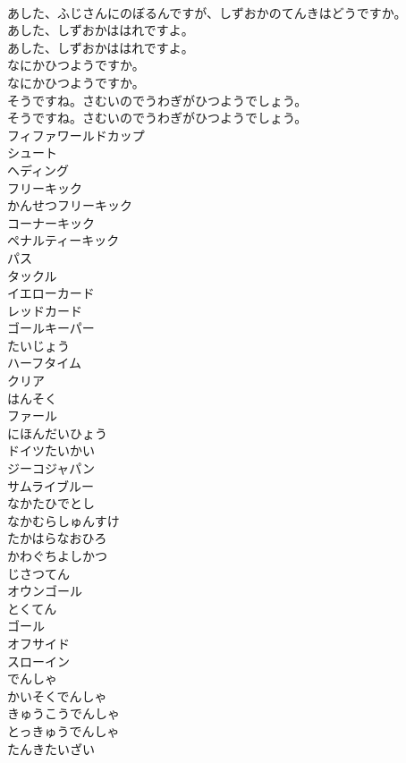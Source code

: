 \documentclass[8pt]{extreport}
\begin{document}
\begin{CJK}{UTF8}{min}
\\	あした、ふじさんにのぼるんですが、しずおかのてんきはどうですか。 
\\	あした、しずおかははれですよ。	
\\	あした、しずおかははれですよ。 
\\	なにかひつようですか。	
\\	なにかひつようですか。 
\\	そうですね。さむいのでうわぎがひつようでしょう。	
\\	そうですね。さむいのでうわぎがひつようでしょう。 
\\	フィファワールドカップ
\\	シュート
\\	ヘディング
\\	フリーキック
\\	かんせつフリーキック
\\	コーナーキック
\\	ペナルティーキック
\\	パス
\\	タックル
\\	イエローカード
\\	レッドカード
\\	ゴールキーパー
\\	たいじょう
\\	ハーフタイム
\\	クリア
\\	はんそく
\\	ファール
\\	にほんだいひょう
\\	ドイツたいかい
\\	ジーコジャパン
\\	サムライブルー
\\	なかたひでとし
\\	なかむらしゅんすけ
\\	たかはらなおひろ
\\	かわぐちよしかつ
\\	じさつてん
\\	オウンゴール
\\	とくてん
\\	ゴール
\\	オフサイド
\\	スローイン
\\	でんしゃ
\\	かいそくでんしゃ
\\	きゅうこうでんしゃ
\\	とっきゅうでんしゃ
\\	たんきたいざい

\end{CJK}
\end{document}
